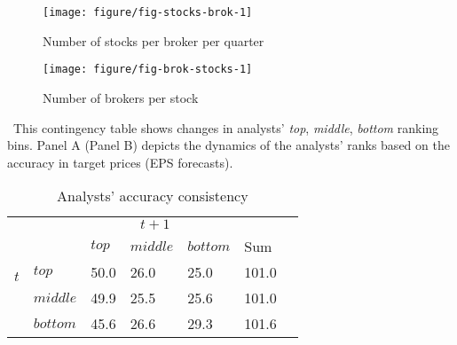\documentclass{article}\usepackage[]{graphicx}\usepackage[]{color}
\makeatletter
\def\maxwidth{ %
  \ifdim\Gin@nat@width>\linewidth
    \linewidth
  \else
    \Gin@nat@width
  \fi
}
\newenvironment{knitrout}{}{} %
\makeatother
\begin{document}
\begin{knitrout}
\color{fgcolor}\begin{figure}
\texttt{[image: figure/fig-stocks-brok-1]} \caption[Number of stocks per broker per quarter]{Number of stocks per broker per quarter}\label{num-s-bfig-stocks-brok}
\end{figure}


\end{knitrout}

\begin{knitrout}
\color{fgcolor}\begin{figure}
\texttt{[image: figure/fig-brok-stocks-1]} \caption[Number of brokers per stock]{Number of brokers per stock}\label{num-b-sfig-brok-stocks}
\end{figure}


\end{knitrout}


\begin{table}[hp]
  \caption{Analysts' accuracy consistency}
  \label{tab:rank-stat}
  
\ This contingency table shows changes in analysts'  \textit{top}, \textit{middle}, \textit{bottom} ranking bins. Panel A (Panel B) depicts the dynamics of the analysts' ranks  based on the accuracy in target prices (EPS forecasts).
\begin{tabularx}{\linewidth}{r*{6}{Y}}
    \toprule
{}& \\
& &$top$&$middle$&$bottom$&Sum\\

 &$top$ & 50.0 & 26.0 & 25.0 & 101.0 \\ 
  &$middle$ & 49.9 & 25.5 & 25.6 & 101.0 \\ 
  &$bottom$ & 45.6 & 26.6 & 29.3 & 101.6 \\ 
  
\bottomrule
\end{tabularx}
\end{table}
\end{document}
